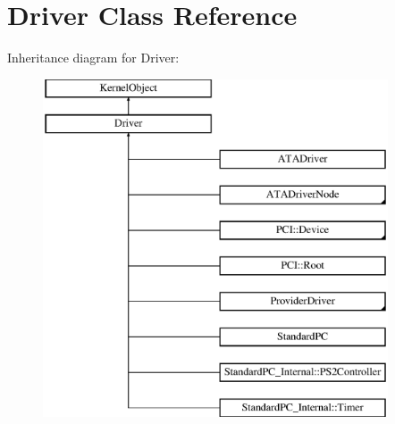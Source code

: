 \hypertarget{class_driver}{}\section{Driver Class Reference}
\label{class_driver}
Inheritance diagram for Driver\+:\begin{figure}[H]
\begin{center}
\leavevmode
\includegraphics[height=10.000000cm]{class_driver}
\end{center}
\end{figure}
